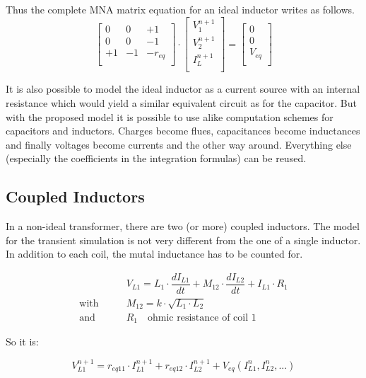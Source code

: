 Thus the complete MNA matrix equation for an ideal inductor writes
as follows.
\begin{equation}
\begin{bmatrix}
0 & 0 & +1\\
0 & 0 & -1\\
+1 & -1 & -r_{eq}\\
\end{bmatrix}
\cdot
\begin{bmatrix}
V_1^{n+1}\\
V_2^{n+1}\\
I_L^{n+1}\\
\end{bmatrix}
=
\begin{bmatrix}
0\\
0\\
V_{eq}\\
\end{bmatrix}
\end{equation}

It is also possible to model the ideal inductor as a current source with
an internal resistance which would yield a similar equivalent circuit
as for the capacitor.  But with the proposed model it is possible to
use alike computation schemes for capacitors and inductors.  Charges
become flues, capacitances become inductances and finally voltages
become currents and the other way around.  Everything else (especially
the coefficients in the integration formulas) can be reused.


\subsection{Coupled Inductors}

In a non-ideal transformer, there are two (or more) coupled inductors.
The model for the transient simulation is not very different from the
one of a single inductor. In addition to each coil, the mutal inductance
has to be counted for.

\begin{align}
 & V_{L1} = L_1\cdot\dfrac{d I_{L1}}{d t} + M_{12}\cdot\dfrac{d I_{L2}}{d t}
            + I_{L1}\cdot R_1 \\
\text{with}\qquad & M_{12} = k\cdot\sqrt{L_1\cdot L_2} \\
\text{and}\qquad  & R_1 \quad\text{ohmic resistance of coil 1}
\end{align}

So it is:

\begin{equation}
V_{L1}^{n+1} = r_{eq11}\cdot I_{L1}^{n+1} + r_{eq12}\cdot I_{L2}^{n+1}
             + V_{eq}(I_{L1}^n, I_{L2}^n, ...)
\end{equation}

